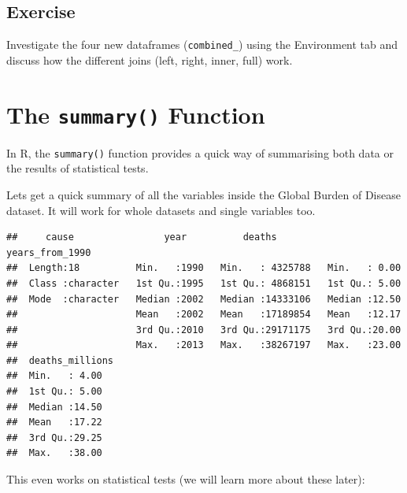\documentclass[]{book}
\makeatletter
\newenvironment{Shaded}{\begin{snugshade}}{\end{snugshade}}
\newcommand{\KeywordTok}[1]{\textcolor[rgb]{0.13,0.29,0.53}{\textbf{#1}}}
\newcommand{\DataTypeTok}[1]{\textcolor[rgb]{0.13,0.29,0.53}{#1}}
\newcommand{\StringTok}[1]{\textcolor[rgb]{0.31,0.60,0.02}{#1}}
\newcommand{\CommentTok}[1]{\textcolor[rgb]{0.56,0.35,0.01}{\textit{#1}}}
\newcommand{\OperatorTok}[1]{\textcolor[rgb]{0.81,0.36,0.00}{\textbf{#1}}}
\newcommand{\NormalTok}[1]{#1}
\newenvironment{kframe}{%
\medskip{}
\setlength{\fboxsep}{.8em}
 \def\at@end@of@kframe{}%
 \ifinner\ifhmode%
  \def\at@end@of@kframe{\end{minipage}}%
  \begin{minipage}{\columnwidth}%
 \fi\fi%
 \def\FrameCommand##1{\hskip\@totalleftmargin \hskip-\fboxsep
 \colorbox{shadecolor}{##1}\hskip-\fboxsep
     \hskip-\linewidth \hskip-\@totalleftmargin \hskip\columnwidth}%
 \MakeFramed {\advance\hsize-\width
   \@totalleftmargin\z@ \linewidth\hsize
   \@setminipage}}%
 {\par\unskip\endMakeFramed%
 \at@end@of@kframe}
\renewenvironment{Shaded}{\begin{kframe}}{\end{kframe}}
\makeatother
\begin{document}
\subsection{Exercise}\label{exercise-13}

Investigate the four new dataframes (\texttt{combined\_}) using the
Environment tab and discuss how the different joins (left, right, inner,
full) work.

\section{\texorpdfstring{The \texttt{summary()}
Function}{The summary() Function}}\label{the-summary-function}

In R, the \texttt{summary()} function provides a quick way of
summarising both data or the results of statistical tests.

Lets get a quick summary of all the variables inside the Global Burden
of Disease dataset. It will work for whole datasets and single variables
too.

\begin{Shaded}
\end{Shaded}

\begin{verbatim}
##     cause                year          deaths         years_from_1990
##  Length:18          Min.   :1990   Min.   : 4325788   Min.   : 0.00  
##  Class :character   1st Qu.:1995   1st Qu.: 4868151   1st Qu.: 5.00  
##  Mode  :character   Median :2002   Median :14333106   Median :12.50  
##                     Mean   :2002   Mean   :17189854   Mean   :12.17  
##                     3rd Qu.:2010   3rd Qu.:29171175   3rd Qu.:20.00  
##                     Max.   :2013   Max.   :38267197   Max.   :23.00  
##  deaths_millions
##  Min.   : 4.00  
##  1st Qu.: 5.00  
##  Median :14.50  
##  Mean   :17.22  
##  3rd Qu.:29.25  
##  Max.   :38.00
\end{verbatim}

This even works on statistical tests (we will learn more about these
later):

\begin{Shaded}
\end{Shaded}
\end{document}
